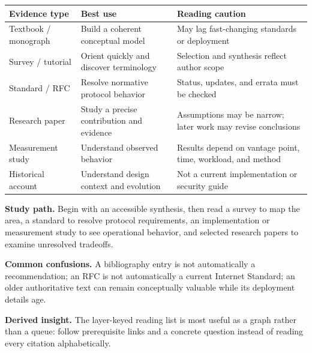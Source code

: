 \documentclass[10pt,letterpaper]{article}
\begin{document}

\begin{longtable}{@{}L{0.313\textwidth}L{0.313\textwidth}L{0.313\textwidth}@{}}
\toprule
\textbf{Evidence type} & \textbf{Best use} & \textbf{Reading caution} \\ \midrule
Textbook / monograph & Build a coherent conceptual model & May lag fast-changing standards or deployment \\
Survey / tutorial & Orient quickly and discover terminology & Selection and synthesis reflect author scope \\
Standard / RFC & Resolve normative protocol behavior & Status, updates, and errata must be checked \\
Research paper & Study a precise contribution and evidence & Assumptions may be narrow; later work may revise conclusions \\
Measurement study & Understand observed behavior & Results depend on vantage point, time, workload, and method \\
Historical account & Understand design context and evolution & Not a current implementation or security guide \\
\bottomrule
\end{longtable}

\begin{overviewbox}\textbf{Study path.} Begin with an accessible synthesis, then read a survey to map the area, a standard to resolve protocol requirements, an implementation or measurement study to see operational behavior, and selected research papers to examine unresolved tradeoffs.\par
\textbf{Common confusions.} A bibliography entry is not automatically a recommendation; an RFC is not automatically a current Internet Standard; an older authoritative text can remain conceptually valuable while its deployment details age.\par
\textbf{Derived insight.} The layer-keyed reading list is most useful as a graph rather than a queue: follow prerequisite links and a concrete question instead of reading every citation alphabetically.\end{overviewbox}

\end{document}
